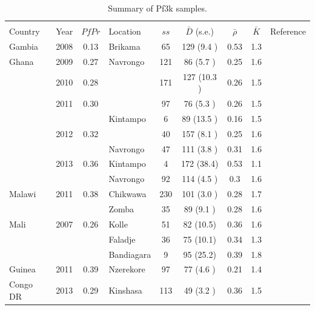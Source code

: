 \documentclass[9pt,lineno]{elife}
\begin{document}
\begin{table}[btp]
  \caption{Summary of Pf3k samples.}\label{tab:Pf3k}
{\small
\begin{tabular}{p{1.4cm} c c |p{1.7cm} c c c c p{2.7cm}}
\toprule
                &                    &      &         &        &                   &              &          &  \\
Country         &   Year   &$PfPr$&Location & $ss$   & $\bar{D}$ (s.e.)  & $\bar{\rho}$ & $\bar{K}$& Reference\\
\midrule
Gambia          &2008           &0.13  &Brikama&65   &129  (9.4 )&0.53 &1.3  & \citet{Amambua-Ngwa2012}\\
\hline
Ghana           &2009           &0.27  &Navrongo&121  &86   (5.7 )&0.25 &1.6  &\multirow{3}{*}{\parbox{3.4cm}{\citet{Duffy2015,Kamau2015,eLife2016}}}\\
                &2010           &0.28  &               &171  &127  (10.3 )&0.26 &1.5  &\\
                &2011           &0.30  &               &97   &76   (5.3 )&0.26 &1.5  &\\
                &               &      &Kintampo&6   &89   (13.5 )&0.16 &1.5  &\\
                &2012           &0.32  &               &40   &157  (8.1 )&0.25 &1.6  &\\
                &               &      &Navrongo&47   &111  (3.8 )&0.31 &1.6  &\\
                &2013           &0.36  &Kintampo&4    &172  (38.4)&0.53 &1.1  &\\
                &               &      &Navrongo&92   &114  (4.5 )&0.3  &1.6  &\\
\hline
Malawi          &2011           &0.38  &Chikwawa&230  &101   (3.0 )&0.28 &1.7  &\citet{Ocholla2014}\\
                &               &      &Zomba&35   &89   (9.1 )&0.28 &1.6  &\\
\hline
Mali            &2007           &0.26  &Kolle&51   &82   (10.5)&0.36 &1.6  &\multirow{3}{*}{\parbox{3.4cm}{\citet{eLife2016}}}\\
                &               &      &Faladje&36   &75   (10.1)&0.34 &1.3  &\\
                &               &      &Bandiagara&9    &95   (25.2)&0.39 &1.8  &\\
\cline{1-8}
Guinea          &2011           &0.39  &Nzerekore&97  &77   (4.6 )&0.21 &1.4  &\\
\cline{1-8}
Congo DR        &2013           &0.29  &Kinshasa&113  &49   (3.2 )&0.36 &1.5  &\\

\end{tabular}}
\end{table}
\end{document}
